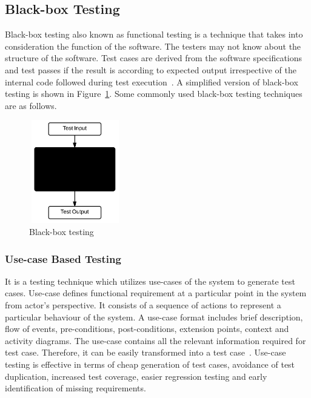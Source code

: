 \subsection{Black-box Testing}
Black-box testing also known as functional testing is a technique that takes into consideration the function of the software. The testers may not know about the structure of the software. Test cases are derived from the software specifications and test passes if the result is according to expected output irrespective of the internal code followed during test execution~\cite{beizer1995black}. A simplified version of black-box testing is shown in Figure~\ref{fig:blackBox}. Some commonly used black-box testing techniques are as follows.

\bigskip
\begin{figure}[h]
\begin{center}
	\includegraphics[width=4cm, height=4.5cm ]{chapter2/blackBox.png}
	\bigskip
	\caption{Black-box testing}
 	\label{fig:blackBox}
\end{center}  
\end{figure}
\bigskip



\subsubsection{Use-case Based Testing}
It is a testing technique which utilizes use-cases of the system to generate test cases. Use-case defines functional requirement at a particular point in the system from actor's perspective. It consists of a sequence of actions to represent a particular behaviour of the system. A use-case format includes brief description, flow of events, pre-conditions, post-conditions, extension points, context and activity diagrams. The use-case contains all the relevant information required for test case. Therefore, it can be easily transformed into a test case~\cite{armour2000advanced}. Use-case testing is effective in terms of cheap generation of test cases, avoidance of test duplication, increased test coverage, easier regression testing and early identification of missing requirements.  

